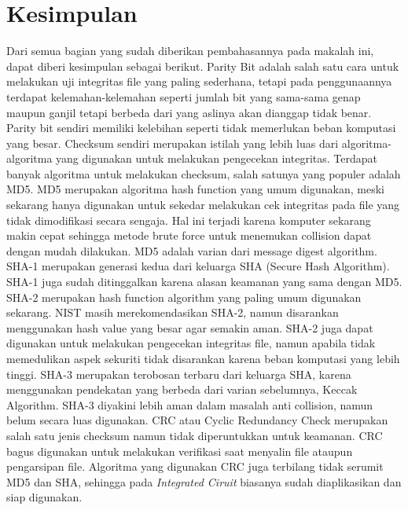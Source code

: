\section{Kesimpulan}
\label{sec:kesimpulan}


Dari semua bagian yang sudah diberikan pembahasannya pada makalah ini, dapat diberi kesimpulan sebagai berikut. Parity Bit adalah salah satu cara untuk melakukan uji integritas file yang paling sederhana, tetapi pada penggunaannya terdapat kelemahan-kelemahan seperti jumlah bit yang sama-sama genap maupun ganjil tetapi berbeda dari yang aslinya akan dianggap tidak benar. Parity bit sendiri memiliki kelebihan seperti tidak memerlukan beban komputasi yang besar. Checksum sendiri merupakan istilah yang lebih luas dari algoritma-algoritma yang digunakan untuk melakukan pengecekan integritas. Terdapat banyak algoritma untuk melakukan checksum, salah satunya yang populer adalah MD5. MD5 merupakan algoritma hash function yang umum digunakan, meski sekarang hanya digunakan untuk sekedar melakukan cek integritas pada file yang tidak dimodifikasi secara sengaja. Hal ini terjadi karena komputer sekarang makin cepat sehingga metode brute force untuk menemukan collision dapat dengan mudah dilakukan. MD5 adalah varian dari message digest algorithm. SHA-1 merupakan generasi kedua dari keluarga SHA (Secure Hash Algorithm). SHA-1 juga sudah ditinggalkan karena alasan keamanan yang sama dengan MD5. SHA-2 merupakan hash function algorithm yang paling umum digunakan sekarang. NIST masih merekomendasikan SHA-2, namun disarankan menggunakan hash value yang besar agar semakin aman. SHA-2 juga dapat digunakan untuk melakukan pengecekan integritas file, namun apabila tidak memedulikan aspek sekuriti tidak disarankan karena beban komputasi yang lebih tinggi. SHA-3 merupakan terobosan terbaru dari keluarga SHA, karena menggunakan pendekatan yang berbeda dari varian sebelumnya, Keccak Algorithm. SHA-3 diyakini lebih aman dalam masalah anti collision, namun belum secara luas digunakan. CRC atau Cyclic Redundancy Check merupakan salah satu jenis checksum namun tidak diperuntukkan untuk keamanan. CRC bagus digunakan untuk melakukan verifikasi saat menyalin file ataupun pengarsipan file. Algoritma yang digunakan CRC juga terbilang tidak serumit MD5 dan SHA, sehingga pada \emph{Integrated Ciruit} biasanya sudah diaplikasikan dan siap digunakan. 
